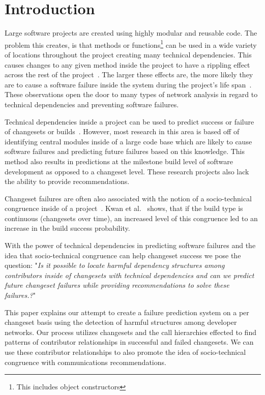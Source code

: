 \documentclass[conference]{IEEEtran}
\begin{document}
\section{Introduction}

Large software projects are created using highly modular and 
reusable code. The problem this creates, is that methods or functions\footnote{This includes object constructors} 
can be used in a wide variety of locations throughout the project creating many technical 
dependencies.  This causes changes to any given method inside the project to have a rippling 
effect across the rest of the project~\cite{Acharya:2011:PCI}. The larger these effects are,
the more likely they are to cause a software failure inside the system during the project's
life span~\cite{Zimmermann:2008:PDU}. These observations open the door to many types
of network analysis in regard to technical dependencies and preventing software failures.

Technical dependencies inside a project can be used to predict success or failure of 
changesets or builds~\cite{Pinzger:2008:DNP, Zimmermann:2008:PDU}. However, most 
research in this area is based off of identifying
central modules inside of a large code base which are likely to cause software failures and 
predicting future failures based on this knowledge. This method also results in predictions 
at the milestone build level of software development as opposed to a changeset level.
These research projects also lack the ability to provide recommendations.

Changeset failures are often also associated with the notion of a socio-technical 
congruence inside of a project~\cite{Conway:1968}. Kwan et al.~\cite{Kwan:2011:SD} shows, 
that if the build type is continuous (changesets over time), an increased level of this
congruence led to an increase in the build success probability.

With the power of technical dependencies in predicting software failures and the idea
that socio-technical congruence can help changeset success we pose the question: 
"\textit{Is it possible to locate harmful dependency structures among contributors inside
of changesets with technical dependencies and can we predict future changeset failures
while providing recommendations to solve these failures.?}"

This paper explains our attempt to create a failure prediction system on a per changeset basis using
the detection of harmful structures among developer networks.
Our process utilizes changesets and the call hierarchies effected  to find patterns of contributor 
relationships in successful and failed changesets.  We can use these contributor relationships 
to also promote the idea of socio-technical congruence with communications recommendations.
\end{document}
